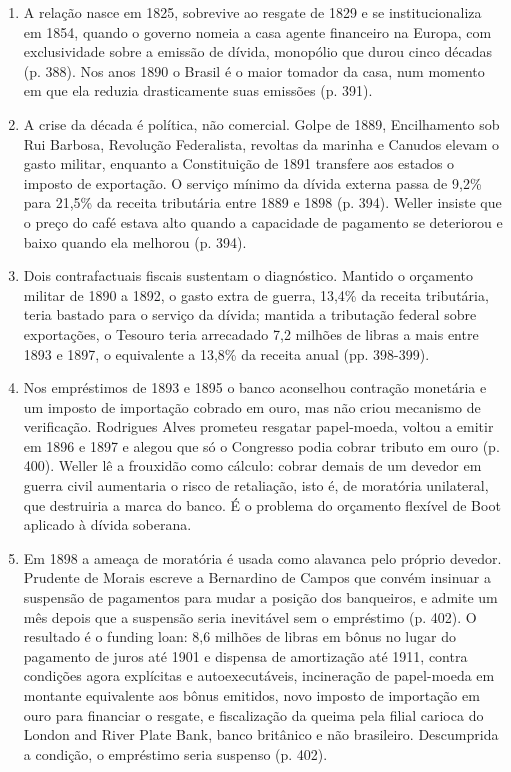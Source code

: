 \begin{enumerate}[nosep]
\item A relação nasce em 1825, sobrevive ao resgate de 1829 e se institucionaliza
em 1854, quando o governo nomeia a casa agente financeiro na Europa, com
exclusividade sobre a emissão de dívida, monopólio que durou cinco décadas
(p. 388). Nos anos 1890 o Brasil é o maior tomador da casa, num momento em que
ela reduzia drasticamente suas emissões (p. 391).

\item A crise da década é política, não comercial. Golpe de 1889, Encilhamento
sob Rui Barbosa, Revolução Federalista, revoltas da marinha e Canudos elevam o
gasto militar, enquanto a Constituição de 1891 transfere aos estados o imposto
de exportação. O serviço mínimo da dívida externa passa de 9,2\% para 21,5\% da
receita tributária entre 1889 e 1898 (p. 394). Weller insiste que o preço do
café estava alto quando a capacidade de pagamento se deteriorou e baixo quando
ela melhorou (p. 394).

\item Dois contrafactuais fiscais sustentam o diagnóstico. Mantido o orçamento
militar de 1890 a 1892, o gasto extra de guerra, 13,4\% da receita tributária,
teria bastado para o serviço da dívida; mantida a tributação federal sobre
exportações, o Tesouro teria arrecadado 7,2 milhões de libras a mais entre 1893
e 1897, o equivalente a 13,8\% da receita anual (pp. 398-399).


\item Nos empréstimos de 1893 e 1895 o banco aconselhou contração monetária e um
imposto de importação cobrado em ouro, mas não criou mecanismo de verificação.
Rodrigues Alves prometeu resgatar papel-moeda, voltou a emitir em 1896 e 1897 e
alegou que só o Congresso podia cobrar tributo em ouro (p. 400). Weller lê a
frouxidão como cálculo: cobrar demais de um devedor em guerra civil aumentaria o
risco de retaliação, isto é, de moratória unilateral, que destruiria a marca do
banco. É o problema do orçamento flexível de Boot aplicado à dívida soberana.

\item Em 1898 a ameaça de moratória é usada como alavanca pelo próprio devedor.
Prudente de Morais escreve a Bernardino de Campos que convém insinuar a
suspensão de pagamentos para mudar a posição dos banqueiros, e admite um mês
depois que a suspensão seria inevitável sem o empréstimo (p. 402). O resultado é
o funding loan: 8,6 milhões de libras em bônus no lugar do pagamento de juros
até 1901 e dispensa de amortização até 1911, contra condições agora explícitas e
autoexecutáveis, incineração de papel-moeda em montante equivalente aos bônus
emitidos, novo imposto de importação em ouro para financiar o resgate, e
fiscalização da queima pela filial carioca do London and River Plate Bank, banco
britânico e não brasileiro. Descumprida a condição, o empréstimo seria suspenso
(p. 402).


\end{enumerate}
